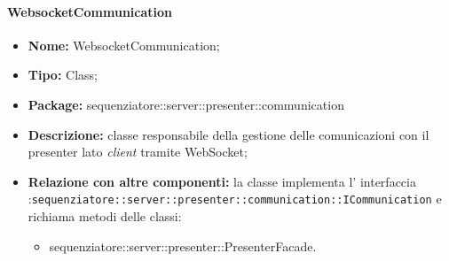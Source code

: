 \paragraph{WebsocketCommunication}
	\begin{itemize}
		\item \textbf{Nome:} WebsocketCommunication;
		\item \textbf{Tipo:} Class;
		\item \textbf{Package:} sequenziatore::server::presenter::communication
		\item \textbf{Descrizione:} classe responsabile della gestione delle comunicazioni con il presenter lato \textit{client} tramite WebSocket;
		\item \textbf{Relazione con altre componenti:} la classe implementa l' interfaccia :\texttt{sequenziatore::server::presenter::communication::ICommunication} e richiama metodi delle classi:
		\begin{itemize}
			\item sequenziatore::server::presenter::PresenterFacade.
		\end{itemize}
	\end{itemize}
